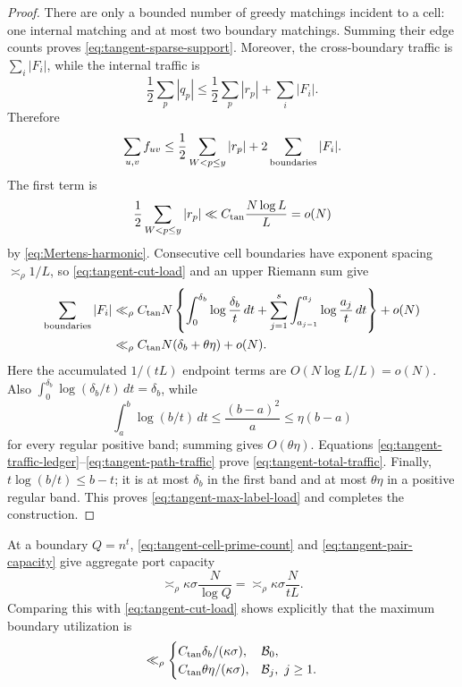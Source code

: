 \documentclass[11pt]{article}
\numberwithin{equation}{section}
\theoremstyle{definition}
\theoremstyle{remark}
\newcommand{\1}{\mathbf 1}
\begin{document}
\begin{proof}
There are only a bounded number of greedy matchings incident to a cell:
one internal matching and at most two boundary matchings.  Summing their
edge counts proves \eqref{eq:tangent-sparse-support}.  Moreover, the
cross-boundary traffic is \(\sum_i|F_i|\), while the internal traffic is
\[
 \frac12\sum_p|q_p|
 \leq\frac12\sum_p|r_p|+\sum_i|F_i|.
\]
Therefore
\begin{equation}
 \sum_{u,v}f_{uv}
 \leq\frac12\sum_{W<p\leq y}|r_p|+2\sum_{\rm boundaries}|F_i|.
\label{eq:tangent-traffic-ledger}
\end{equation}
The first term is
\begin{equation}
 \frac12\sum_{W<p\leq y}|r_p|
       \ll C_{\rm tan}\frac{N\log L}{L}=o(N)
\label{eq:tangent-direct-traffic}
\end{equation}
by \eqref{eq:Mertens-harmonic}.  Consecutive cell boundaries have
exponent spacing \(\asymp_\rho1/L\), so
\eqref{eq:tangent-cut-load} and an upper Riemann sum give
\begin{align}
 \sum_{\rm boundaries}|F_i|
 &\ll_\rho C_{\rm tan}N\left\{
 \int_0^{\delta_b}\log\frac{\delta_b}{t}\,dt
 +
 \sum_{j=1}^s\int_{a_{j-1}}^{a_j}
                 \log\frac{a_j}{t}\,dt\right\}+o(N)\notag\\
 &\ll_\rho C_{\rm tan}N(\delta_b+\theta\eta)+o(N).
\label{eq:tangent-path-traffic}
\end{align}
Here the accumulated \(1/(tL)\) endpoint terms are
\(O(N\log L/L)=o(N)\).  Also
\(\int_0^{\delta_b}\log(\delta_b/t)\,dt=\delta_b\), while
\[
 \int_a^b\log(b/t)\,dt
 \leq\frac{(b-a)^2}{a}
 \leq\eta(b-a)
\]
for every regular positive band; summing gives \(O(\theta\eta)\).
Equations \eqref{eq:tangent-traffic-ledger}--\eqref{eq:tangent-path-traffic} prove
\eqref{eq:tangent-total-traffic}.  Finally,
\(t\log(b/t)\leq b-t\); it is at most \(\delta_b\) in the first band and
at most \(\theta\eta\) in a positive regular band.  This proves
\eqref{eq:tangent-max-label-load} and completes the construction.
\end{proof}

At a boundary \(Q=n^t\), \eqref{eq:tangent-cell-prime-count} and
\eqref{eq:tangent-pair-capacity} give aggregate port capacity
\begin{equation}
 \asymp_\rho\kappa\sigma\frac{N}{\log Q}
       =\asymp_\rho\kappa\sigma\frac{N}{tL}.
\label{eq:tangent-boundary-capacity}
\end{equation}
Comparing this with \eqref{eq:tangent-cut-load} shows explicitly that
the maximum boundary utilization is
\begin{equation}
 \ll_\rho
 \begin{cases}
 C_{\rm tan}\delta_b/(\kappa\sigma),&\mathcal B_0,\\
 C_{\rm tan}\theta\eta/(\kappa\sigma),&\mathcal B_j,\ j\geq1.
 \end{cases}
\label{eq:tangent-utilization}
\end{equation}
\end{document}
